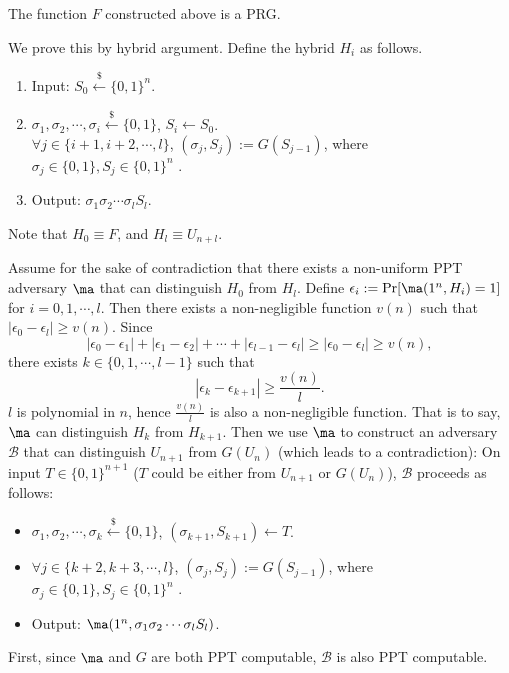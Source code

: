 \begin{theorem}
The function $F$ constructed above is a PRG.
\end{theorem}

\proof
We prove this by hybrid argument. Define the hybrid $H_i$ as follows.
\begin{enumerate}[label=(\alph*)]
	\item Input: $S_0 \xleftarrow{\$} \{0, 1\}^n$.
    \item $\sigma_1, \sigma_2, \cdots, \sigma_i \xleftarrow{\$} \{0, 1\}$, $S_i \gets S_0$.\\
     $\forall j \in \{i+1, i+2, \cdots, l\}$, $(\sigma_j, S_j) := G(S_{j-1})$, where $\sigma_j \in \{0, 1\}, S_j \in \{0, 1\}^n$ .
    \item Output: $\sigma_1 \sigma_2 \cdots \sigma_l S_l$.
\end{enumerate}
Note that $H_0 \equiv F$, and $H_l \equiv U_{n+l}$.

Assume for the sake of contradiction that there exists a non-uniform PPT adversary $\ma$ that can distinguish $H_0$ from $H_l$.
Define $\epsilon_i := \Pr[\ma(1^n, H_i)=1]$ for $i = 0, 1, \cdots, l$.
Then there exists a non-negligible function $v(n)$ such that $|\epsilon_0 - \epsilon_l| \geq v(n)$.
Since
\[
|\epsilon_0 - \epsilon_1| +
|\epsilon_1 - \epsilon_2| +
\cdots +
|\epsilon_{l-1} - \epsilon_l| \geq
|\epsilon_0 - \epsilon_l|
\geq v(n),
\]
there exists $k \in \{0, 1, \cdots, l-1\}$ such that
\[
|\epsilon_{k} - \epsilon_{k+1}| \geq \frac{v(n)}{l}.
\]
$l$ is polynomial in $n$, hence $\frac{v(n)}{l}$ is also a non-negligible function.
That is to say, $\ma$ can distinguish $H_{k}$ from $H_{k+1}$.
Then we use $\ma$ to construct an adversary $\mathcal{B}$ that can distinguish $U_{n+1}$ from $G(U_n)$ (which leads to a contradiction):
On input $T \in \{0, 1\}^{n+1}$ ($T$ could be either from $U_{n+1}$ or $G(U_n)$), $\mathcal{B}$ proceeds as follows:
\begin{itemize}
\item $\sigma_1, \sigma_2, \cdots, \sigma_k \xleftarrow{\$} \{0, 1\}$, $(\sigma_{k+1}, S_{k+1}) \gets T$.
\item $\forall j \in \{k+2, k+3, \cdots, l\}$, $(\sigma_j, S_j) := G(S_{j-1})$, where $\sigma_j \in \{0, 1\}, S_j \in \{0, 1\}^n$ .
\item Output: $\ma(1^n, \sigma_1 \sigma_2 \cdots \sigma_l S_l)$.
\end{itemize}

First, since $\ma$ and $G$ are both PPT computable, $\mathcal{B}$ is also PPT computable.

